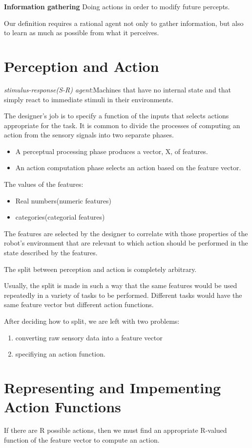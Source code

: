 \textbf{Information gathering} Doing actions in order to modify future percepts.

Our definition requires a rational agent not only to gather information, but
also to learn as much as possible from what it perceives.

\section{Perception and Action}
\emph{stimulus-response(S-R) agent}:Machines that have no internal state and that simply react to immediate stimuli in their environments.

The designer's job is to specify a function of the inputs that selects actions appropriate for the task. It is common to divide the processes of computing an action from the sensory signals into two separate phases.
\begin{itemize}
\item A perceptual processing phase produces a vector, X, of features.
\item An action computation phase selects an action based on the feature vector.
\end{itemize}
The values of the features:
\begin{itemize}
\item Real numbers(numeric features) 
\item categories(categorial features)
\end{itemize}

The features are selected by the designer to correlate with those properties of the robot's environment that are relevant to which action should be performed in the state described by the features.

The split between perception and action is completely arbitrary.

Usually, the split is made in such a way that the same features would be used repeatedly in a variety of tasks to be performed. Different tasks would have the same feature vector but different action functions.

After deciding how to split, we are left with two problems:
\begin{enumerate}
\item converting raw sensory data into a feature vector
\item specifiying an action function.
\end{enumerate}
\section{Representing and Impementing Action Functions}
If there are R possible actions, then we must find an appropriate R-valued function of the feature vector to compute an action.

